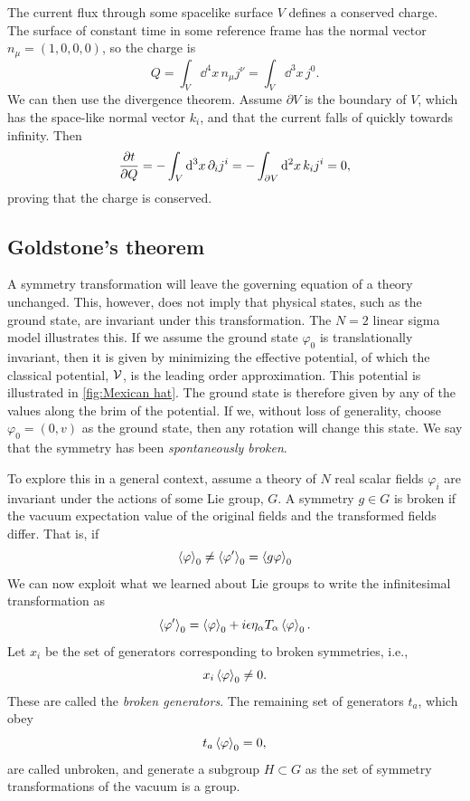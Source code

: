 The current flux through some spacelike surface $V$ defines a conserved charge. The surface of constant time in some reference frame has the normal vector $n_\mu = (1, 0, 0, 0)$, so the charge is
\begin{equation}
    Q = \int_V \dd^4 x \, n_\mu j^\nu = \int_V \dd^3 x \, j^0.
\end{equation}
%
We can then use the divergence theorem.
Assume $\partial V$ is the boundary of $V$, which has the space-like normal vector $k_i$, and that the current falls of quickly towards infinity.
Then
\begin{equation}
    \pdv{t} Q = - \int_V \dd^3 x \, \partial_i j^i = - \int_{\partial V} \dd^2 x\, k_i j^i = 0,
\end{equation}
%
proving that the charge is conserved.

\subsection{Goldstone's theorem}

A symmetry transformation will leave the governing equation of a theory unchanged.
This, however, does not imply that physical states, such as the ground state, are invariant under this transformation.
The $N = 2$ linear sigma model illustrates this.
If we assume the ground state $\varphi_{0}$ is translationally invariant, then it is given by minimizing the effective potential, of which the classical potential, $\mathcal{V}$, is the leading order approximation.
This potential is illustrated in \autoref{fig:Mexican hat}.
The ground state is therefore given by any of the values along the brim of the potential.
If we, without loss of generality, choose $\varphi_0 = (0, v)$ as the ground state, then any rotation will change this state.
We say that the symmetry has been \emph{spontaneously broken}.

To explore this in a general context, assume a theory of $N$ real scalar fields $\varphi_i$ are invariant under the actions of some Lie group, $G$.
A symmetry $g \in G$ is broken if the vacuum expectation value of the original fields and the transformed fields differ.
That is, if
\begin{equation}
    \left\langle \varphi \right\rangle_0 \neq \left\langle \varphi' \right\rangle_0 = \left\langle g \varphi \right\rangle_0
\end{equation}
%
We can now exploit what we learned about Lie groups to write the infinitesimal transformation as
\begin{equation}
    \left\langle \varphi' \right\rangle_0 = \left\langle \varphi \right\rangle_0 + i \epsilon \eta_\alpha T_\alpha \left\langle \varphi \right\rangle_0.
\end{equation}
%
Let $x_i$ be the set of generators corresponding to broken symmetries, i.e.,
\begin{equation}
    x_i \left\langle \varphi \right\rangle_0 \neq 0.
\end{equation}
%
These are called the \emph{broken generators}.
The remaining set of generators $t_a$, which obey
\begin{equation}
    t_a \left\langle \varphi \right\rangle_0 = 0,
\end{equation}
%
are called unbroken, and generate a subgroup $H \subset G$ as the set of symmetry transformations of the vacuum is a group.

